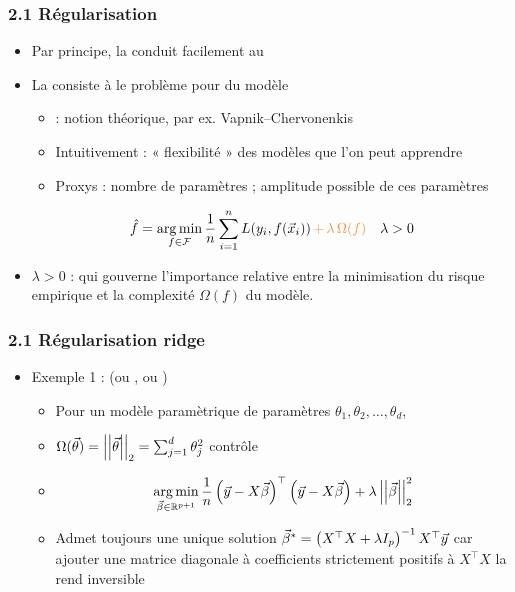 \begin{frame}
  \frametitle{2.1 Régularisation}
  \begin{itemize}
  \item Par principe, la  conduit facilement au 
  \item La  consiste à  le problème pour
     du modèle
    \begin{itemize}
    \item {} : notion théorique, par ex. Vapnik--Chervonenkis
    \item Intuitivement : « flexibilité » des modèles que l'on peut apprendre
    \item Proxys  : nombre de paramètres ; amplitude possible de ces paramètres
    \end{itemize}
    \[ \hat{f} = \argmin_{f \in \fcal} \frac1n \sum_{i=1}^n L(y_i, f(\xvec_i))
      {\color{MyOrange} \, + \, \lambda \, \Omega(f) } \hspace{1em} \lambda > 0
    \]
  \pause
  \item {} $\lambda > 0$ :
     qui gouverne l'importance relative entre la
    minimisation du risque empirique et la complexité $\Omega(f)$ du modèle.
  \end{itemize}
\end{frame}

\begin{frame}
  \frametitle{2.1 Régularisation ridge}
  \begin{itemize}
  \item Exemple 1 :  (ou , ou )
    \begin{itemize}
    \item Pour un modèle paramètrique de paramètres $\theta_1, \theta_2, \dots, \theta_d$,
    \item[] $\Omega(\vec{\theta}) = \left|\left|\vec{\theta}\right|\right|_2 = \sum_{j=1}^d \theta_j^2$ contrôle  
      \pause
      \vspace{1em}
    \item {}
      \[\operatorname*{arg\,min}_{\vec{\beta} \in {\mathbb R}^{p+1}} \frac1n 
        \left(\vec{y} - X \vec{\beta} \right)^\top \left(\vec{y} - X \vec{\beta}
        \right) + \lambda \left|\left|\vec{\beta}\right|\right|_2^2 \]
    \item[] Admet toujours une unique solution
      $\vec{\beta}^* = \left(X^\top X + \lambda I_p \right)^{-1} X^\top \vec{y}$
      car ajouter une matrice diagonale à coefficients strictement positifs à
      $X^\top X$ la rend inversible
    \end{itemize}
  \end{itemize}
\end{frame}

